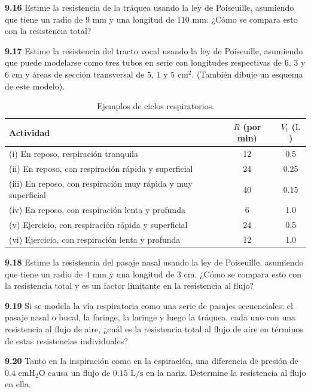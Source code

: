 \documentclass[12pt]{book}
\begin{document}
\noindent \textbf{9.16} Estime la resistencia de la tráquea usando la ley de Poiseuille, asumiendo que tiene un radio de $9\text{ mm}$ y una longitud de $110\text{ mm}$. ¿Cómo se compara esto con la resistencia total?

\noindent \textbf{9.17} Estime la resistencia del tracto vocal usando la ley de Poiseuille, asumiendo que puede modelarse como tres tubos en serie con longitudes respectivas de $6$, $3$ y $6\text{ cm}$ y áreas de sección transversal de $5$, $1$ y $5\text{ cm}^2$. (También dibuje un esquema de este modelo).

\begin{table}[htbp]
  \centering
  \caption{Ejemplos de ciclos respiratorios.}
  \label{tab:9.3}
  \begin{tabularx}{\textwidth}{Xcc}
    \toprule
    Actividad & $R$ (por min) & $V_t$ ($\text{L}$) \\
    \midrule
    (i) En reposo, respiración tranquila & 12 & 0.5 \\
    (ii) En reposo, con respiración rápida y superficial & 24 & 0.25 \\
    (iii) En reposo, con respiración muy rápida y muy superficial & 40 & 0.15 \\
    (iv) En reposo, con respiración lenta y profunda & 6 & 1.0 \\
    (v) Ejercicio, con respiración rápida y superficial & 24 & 0.5 \\
    (vi) Ejercicio, con respiración lenta y profunda & 12 & 1.0 \\
    \bottomrule
  \end{tabularx}
\end{table}

\noindent \textbf{9.18} Estime la resistencia del pasaje nasal usando la ley de Poiseuille, asumiendo que tiene un radio de $4\text{ mm}$ y una longitud de $3\text{ cm}$. ¿Cómo se compara esto con la resistencia total y es un factor limitante en la resistencia al flujo?

\noindent \textbf{9.19} Si se modela la vía respiratoria como una serie de pasajes secuenciales: el pasaje nasal o bucal, la faringe, la laringe y luego la tráquea, cada uno con una resistencia al flujo de aire, ¿cuál es la resistencia total al flujo de aire en términos de estas resistencias individuales?

\noindent \textbf{9.20} Tanto en la inspiración como en la espiración, una diferencia de presión de $0.4\text{ cmH}_2\text{O}$ causa un flujo de $0.15\text{ L/s}$ en la nariz. Determine la resistencia al flujo en ella.
\end{document}
